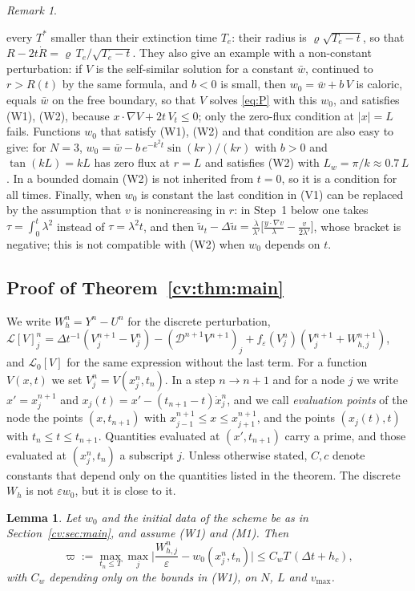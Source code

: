 \documentclass[11pt]{amsart}
\newtheorem{lemma}[theorem]{Lemma}
\theoremstyle{definition}
\theoremstyle{remark}
\newtheorem{remark}[theorem]{Remark}
\newcommand{\ve}{\varepsilon}
\newcommand{\Lop}{\mathcal{L}}
\begin{document}
\begin{remark}
\begin{enumerate}
every $T^*$ smaller than their extinction time $T_e$: their radius is $\varrho\sqrt{T_e-t}$, so
that $R-2t\dot R=\varrho\,T_e/\sqrt{T_e-t}$. They also give an example with a non-constant
perturbation: if $V$ is the self-similar solution for a constant $\bar w$, continued to
$r>R(t)$ by the same formula, and $b<0$ is small, then $w_0=\bar w+b\,V$ is caloric, equals
$\bar w$ on the free boundary, so that $V$ solves \eqref{eq:P} with this $w_0$, and satisfies
(W1), (W2), because $x\cdot\nabla V+2t\,V_t\le0$; only the zero-flux condition at $|x|=L$ fails.
Functions $w_0$ that satisfy (W1), (W2) and that condition are also easy
to give: for $N=3$, $w_0=\bar w-b\,e^{-k^2t}\sin(kr)/(kr)$ with $b>0$ and $\tan(kL)=kL$ has zero
flux at $r=L$ and satisfies (W2) with $L_w=\pi/k\approx0.7\,L$. In a bounded domain (W2) is not
inherited from $t=0$, so it is a condition for all times. Finally, when $w_0$ is constant
the last condition in (V1) can be replaced by the assumption that $v$ is nonincreasing
in $r$: in Step~1 below one takes $\tau=\int_0^t\lambda^2$ instead of $\tau=\lambda^2t$, and then
$\tilde u_t-\Delta\tilde u=\frac{\dot\lambda}{\lambda'}\big[\frac{y\cdot\nabla v}\lambda-\frac v{2\lambda'}\big]$, whose bracket is negative; this is
not compatible with (W2) when $w_0$ depends on $t$.
\end{enumerate}
\end{remark}

\subsection{Proof of Theorem~\ref{cv:thm:main}}

We write $W_h^n=Y^n-U^n$ for the discrete perturbation,
$\Lop[V]^n_j=\Delta t^{-1}(V^{n+1}_j-V^n_j)-(\mathcal D^{n+1}V^{n+1})_j
+f_\ve(V^n_j)(V^{n+1}_j+W^{n+1}_{h,j})$, and $\Lop_0[V]$ for the same expression without the last
term. For a function $V(x,t)$ we set $V^n_j=V(x^n_j,t_n)$. In a step $n\to n+1$ and for a
node $j$ we write $x'=x^{n+1}_j$ and $x_j(t)=x'-(t_{n+1}-t)\dot x^n_j$, and we call
\emph{evaluation points} of the node the points $(x,t_{n+1})$ with
$x^{n+1}_{j-1}\le x\le x^{n+1}_{j+1}$, and the points $(x_j(t),t)$ with $t_n\le t\le t_{n+1}$.
Quantities evaluated at $(x',t_{n+1})$ carry a prime, and those evaluated at $(x^n_j,t_n)$
a subscript $j$. Unless otherwise stated, $C,c$ denote constants that depend only on the
quantities listed in the theorem. The discrete $W_h$ is not $\ve w_0$, but it is close to it.

\begin{lemma}\label{cv:lem:heat}
Let $w_0$ and the initial data of the scheme be as in Section~\ref{cv:sec:main}, and
assume (W1) and (M1). Then
\[
\varpi:=\max_{t_n\le T}\max_j\Big|\frac{W^n_{h,j}}\ve-w_0(x^n_j,t_n)\Big|\le C_wT\,(\Delta t+h_c),
\]
with $C_w$ depending only on the bounds in (W1), on $N$, $L$ and $v_{\max}$.
\end{lemma}
\end{document}
